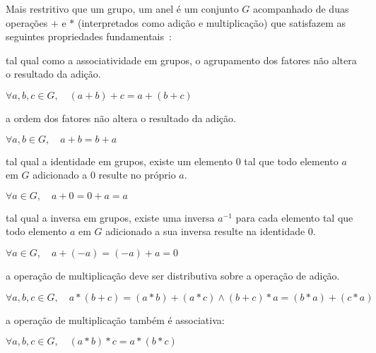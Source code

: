 \documentclass[12pt]{article}
\begin{document}
Mais restritivo que um grupo, um anel é um conjunto $G$ acompanhado de duas
operações $+$ e $*$ (interpretados como adição e multiplicação) que satisfazem
as seguintes propriedades fundamentais~\cite{weisstein:1999:ring}:

\begin{description}
    \setlength\itemsep{1em}

    \item[Associatividade aditiva:] tal qual como a associatividade em grupos,
        o agrupamento  dos fatores não altera o resultado da adição.
        \newline
        \begin{center}
            $\forall a, b, c \in G, \quad (a+b)+c = a+(b+c)$
        \end{center}

    \item[Comutatividade aditiva:] a ordem dos fatores não altera o resultado
        da adição.
        \newline
        \begin{center}
            $\forall a, b \in G, \quad a+b = b+a$
        \end{center}

    \item[Identidade aditiva:] tal qual a identidade em grupos, existe um
        elemento $0$ tal que todo elemento $a$ em $G$ adicionado a $0$ resulte
        no próprio $a$.
        \newline
        \begin{center}
            $\forall a \in G, \quad a+0 = 0+a = a$
        \end{center}

    \item[Inversa aditiva:] tal qual a inversa em grupos, existe uma inversa
        $a^{-1}$ para cada elemento tal que todo elemento $a$ em $G$ adicionado
        a sua inversa resulte na identidade $0$.
        \newline
        \begin{center}
            $\forall a \in G, \quad a+(-a) = (-a)+a = 0$
        \end{center}

    \item[Distributividade:] a operação de multiplicação deve ser distributiva
        sobre a operação de adição.
        \newline
        \begin{center}
            $\forall a, b, c \in G, \quad a*(b+c) = (a*b)+(a*c) \land (b+c)*a = (b*a)+(c*a)$
        \end{center}

    \item[Associatividade multiplicativa:] a operação de multiplicação também é
        associativa:
        \newline
        \begin{center}
            $\forall a, b, c \in G, \quad (a*b)*c = a*(b*c)$
        \end{center}

\end{description}
\end{document}
